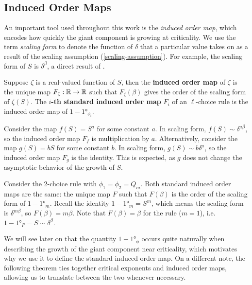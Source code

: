 \documentclass[twoside,10pt]{article}
\begin{document}
\subsection{Induced Order Maps}

An important tool used throughout this work is the \emph{induced order map}, which encodes how quickly the giant component is growing at criticality. We use the term \emph{scaling form} to denote the function of $\delta$ that a particular value takes on as a result of the scaling assumption (\ref{scaling-assumption}). For example, the scaling form of $S$ is $\delta^{\beta}$, a direct result of .

\begin{defn}[]
	Suppose $\zeta$ is a real-valued function of $S$, then the \textbf{induced order map} of $\zeta$ is the unique map $F_{\zeta}:\mathbb{R}\to \mathbb{R}$ such that $F_{\zeta}(\beta)$ gives the order of the scaling form of $\zeta(S)$. The \textbf{$i$-th standard induced order map} $F_{i}$ of an $\ell$-choice rule is the induced order map of $1 - \ang{1}_{\phi_{i}}$.
\end{defn}

\begin{ex}[]
Consider the map $f(S) = S^{a}$ for some constant $a$. In scaling form, $f(S) \sim \delta^{a \beta}$, so the induced order map $F_{f}$ is multiplication by $a$. Alternatively, consider the map $g(S) = b S$ for some constant $b$. In scaling form, $g(S) \sim b \delta^{a}$, so the induced order map $F_{g}$ is the identity. This is expected, as $g$ does not change the asymptotic behavior of the growth of $S$.
\end{ex}

\begin{ex}[]
	Consider the 2-choice rule with $\phi_1 = \phi_2 = Q_{m}$. Both standard induced order maps are the same: the unique map $F$ such that $F(\beta)$ is the order of the scaling form of $1 - \ang{1}_{m}$. Recall the identity $1-\ang{1}_{m}= S^{m}$, which means the scaling form is $\delta^{m \beta}$, so $F(\beta) = m\beta$. Note that $F(\beta)=\beta$ for the \ER rule ($m=1$), i.e. $1 - \ang{1}_{P} = S \sim \delta^{\beta}$.
\end{ex}

We will see later on that the quantity $1-\ang{1}_{\phi}$ occurs quite naturally when describing the growth of the giant component near criticality, which motivates why we use it to define the standard induced order map. On a different note, the following theorem ties together critical exponents and induced order maps, allowing us to translate between the two whenever necessary.
\end{document}
